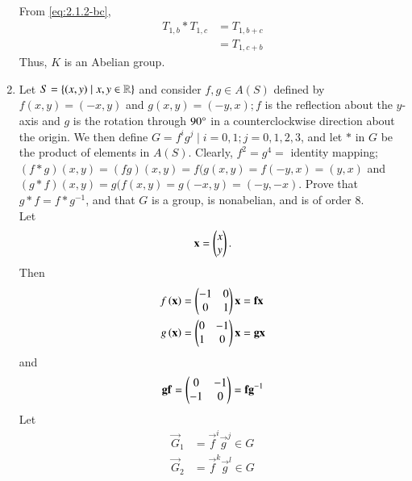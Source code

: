 \begin{enumerate}[label=\arabic*.,ref=\thesubsection.\theenumi]
		\\
		\solution  From \eqref{eq:2.1.2-bc},
		\begin{align}
T_{1,b}
*
			T_{1,c} &= 
T_{1,b+c}  
\\
			&= T_{1,c+b}  
		\end{align}
		Thus, $K$  is an Abelian group.
	\item 
		Let $S = \left\{(x, y) \mid x, y  \in \mathbb{R}\right\}$ and consider $f, g \in A(S)$ defined by $f (x, y) = (-x, y)$ and $g(x, y) = (-y, x); f$ is the reflection about the $y$-axis and $g$ is the rotation through $90\degree$ in a counterclockwise direction about the origin. We then define $G = f^ig^j 
\mid i = 0, 1; j = 0, 1, 2, 3$, and let $*$
in $G$ be the product of elements in $A(S)$. Clearly, $f^2 = g^4 = $ identity mapping; $(f* g)(x, y) = (fg)(x, y) = f(g(x, y) = f( - y, x) = (y, x)$
and $(g*f)(x,y) = g(f(x,y) = g(-x,y) = (-y, -x)$. Prove that $g * f = f * g^{-1}$, and that $G$ is a group, is nonabelian, and is of order 8.
\\
\solution Let 
\begin{align}
	\mathbf{x} = \begin{pmatrix}x \\ y\end{pmatrix}.
\end{align}
Then 
\begin{align}
	f\left(	\mathbf{x}\right) &= \begin{pmatrix}-1 & 0 \\ 0 & 1\end{pmatrix}\mathbf{x} = \mathbf{f}\mathbf{x}
	\\
	g\left(	\mathbf{x}\right) &= \begin{pmatrix}0 & -1 \\ 1 & 0\end{pmatrix}\mathbf{x} =  \mathbf{g}\mathbf{x}
\end{align}
and 
\begin{align}
	\mathbf{g}\mathbf{f} = \begin{pmatrix}0 & -1\\-1 & 0\end{pmatrix} =\mathbf{f}\mathbf{g}^{-1}
\end{align}
Let 
\begin{align}
	\vec{G}_1 &= \vec{f}^i\vec{g}^j \in G
	\\
	\vec{G}_2 &= \vec{f}^k\vec{g}^l \in G
\end{align}


\end{enumerate}
